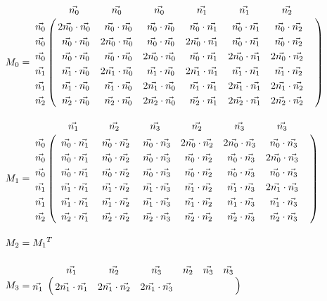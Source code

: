 \begin{align}
M_0&=
\bordermatrix{
&\vec{n_0}&\vec{n_0}&\vec{n_0}
&\vec{n_1}&\vec{n_1}&\vec{n_2}\cr
\vec{n_0}&
2\vec{n_0}\cdot\vec{n_0}&
~\vec{n_0}\cdot\vec{n_0}&
~\vec{n_0}\cdot\vec{n_0}&
~\vec{n_0}\cdot\vec{n_1}&
~\vec{n_0}\cdot\vec{n_1}&
~\vec{n_0}\cdot\vec{n_2}&\cr
\vec{n_0}&
~\vec{n_0}\cdot\vec{n_0}&
2\vec{n_0}\cdot\vec{n_0}&
~\vec{n_0}\cdot\vec{n_0}&
2\vec{n_0}\cdot\vec{n_1}&
~\vec{n_0}\cdot\vec{n_1}&
~\vec{n_0}\cdot\vec{n_2}&\cr
\vec{n_0}&
~\vec{n_0}\cdot\vec{n_0}&
~\vec{n_0}\cdot\vec{n_0}&
2\vec{n_0}\cdot\vec{n_0}&
~\vec{n_0}\cdot\vec{n_1}&
2\vec{n_0}\cdot\vec{n_1}&
2\vec{n_0}\cdot\vec{n_2}&\cr
\vec{n_1}&
~\vec{n_1}\cdot\vec{n_0}&
2\vec{n_1}\cdot\vec{n_0}&
~\vec{n_1}\cdot\vec{n_0}&
2\vec{n_1}\cdot\vec{n_1}&
~\vec{n_1}\cdot\vec{n_1}&
~\vec{n_1}\cdot\vec{n_2}&\cr
\vec{n_1}&
~\vec{n_1}\cdot\vec{n_0}&
~\vec{n_1}\cdot\vec{n_0}&
2\vec{n_1}\cdot\vec{n_0}&
~\vec{n_1}\cdot\vec{n_1}&
2\vec{n_1}\cdot\vec{n_1}&
2\vec{n_1}\cdot\vec{n_2}&\cr
\vec{n_2}&
~\vec{n_2}\cdot\vec{n_0}&
~\vec{n_2}\cdot\vec{n_0}&
2\vec{n_2}\cdot\vec{n_0}&
~\vec{n_2}\cdot\vec{n_1}&
2\vec{n_2}\cdot\vec{n_1}&
2\vec{n_2}\cdot\vec{n_2}&\cr
}\\[10pt]
%
M_1&=
\bordermatrix{
&\vec{n_1}&\vec{n_2}&\vec{n_3}
&\vec{n_2}&\vec{n_3}&\vec{n_3}\cr
\vec{n_0}&
~\vec{n_0}\cdot\vec{n_1}&
~\vec{n_0}\cdot\vec{n_2}&
~\vec{n_0}\cdot\vec{n_3}&
2\vec{n_0}\cdot\vec{n_2}&
2\vec{n_0}\cdot\vec{n_3}&
~\vec{n_0}\cdot\vec{n_3}&\cr
\vec{n_0}&
~\vec{n_0}\cdot\vec{n_1}&
~\vec{n_0}\cdot\vec{n_2}&
~\vec{n_0}\cdot\vec{n_3}&
~\vec{n_0}\cdot\vec{n_2}&
~\vec{n_0}\cdot\vec{n_3}&
2\vec{n_0}\cdot\vec{n_3}&\cr
\vec{n_0}&
~\vec{n_0}\cdot\vec{n_1}&
~\vec{n_0}\cdot\vec{n_2}&
~\vec{n_0}\cdot\vec{n_3}&
~\vec{n_0}\cdot\vec{n_2}&
~\vec{n_0}\cdot\vec{n_3}&
~\vec{n_0}\cdot\vec{n_3}&\cr
\vec{n_1}&
~\vec{n_1}\cdot\vec{n_1}&
~\vec{n_1}\cdot\vec{n_2}&
~\vec{n_1}\cdot\vec{n_3}&
~\vec{n_1}\cdot\vec{n_2}&
~\vec{n_1}\cdot\vec{n_3}&
2\vec{n_1}\cdot\vec{n_3}&\cr
\vec{n_1}&
~\vec{n_1}\cdot\vec{n_1}&
~\vec{n_1}\cdot\vec{n_2}&
~\vec{n_1}\cdot\vec{n_3}&
~\vec{n_1}\cdot\vec{n_2}&
~\vec{n_1}\cdot\vec{n_3}&
~\vec{n_1}\cdot\vec{n_3}&\cr
\vec{n_2}&
~\vec{n_2}\cdot\vec{n_1}&
~\vec{n_2}\cdot\vec{n_2}&
~\vec{n_2}\cdot\vec{n_3}&
~\vec{n_2}\cdot\vec{n_2}&
~\vec{n_2}\cdot\vec{n_3}&
~\vec{n_2}\cdot\vec{n_3}&\cr
}\\[10pt]
%
M_2&={M_1}^{T}\\[10pt]
%
M_3&=
\bordermatrix{
&\vec{n_1}&\vec{n_2}&\vec{n_3}
&\vec{n_2}&\vec{n_3}&\vec{n_3}\cr
\vec{n_1}&
2\vec{n_1}\cdot\vec{n_1}&
2\vec{n_1}\cdot\vec{n_2}&
2\vec{n_1}\cdot\vec{n_3}&
}
\end{align}
